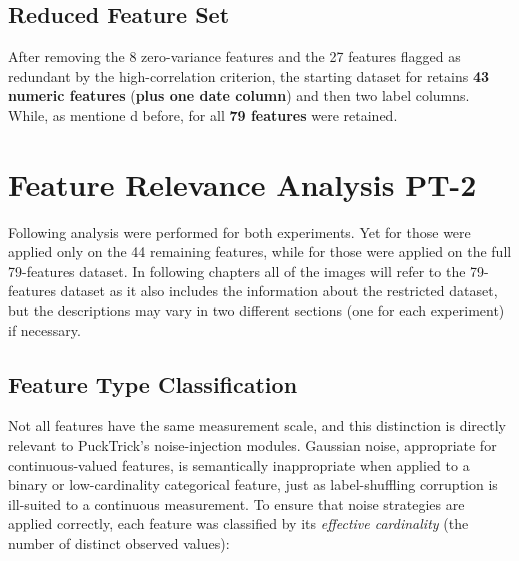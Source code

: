 \documentclass[../main.tex]{subfiles}
\begin{document}
\subsection{Reduced Feature Set}
\label{sec:reduced-feature-set}

After removing the 8 zero-variance features and the 27 features flagged as redundant by the high-correlation criterion, the starting dataset for  retains \textbf{43 numeric features} (\textbf{plus one date column}) and then two label columns. While, as mentione d before, for  all \textbf{79 features} were retained.


\newpage
\section{Feature Relevance Analysis PT-2}
\label{sec:feature-relevance-PT2}

Following analysis were performed for both experiments. Yet for  those were applied only on the 44 remaining features, while for  those were applied on the full 79-features dataset. In following chapters all of the images will refer to the 79-features dataset as it also includes the information about the restricted dataset, but the descriptions may vary in two different sections (one for each experiment) if necessary.


\subsection{Feature Type Classification}
\label{sec:feature-types}

Not all features have the same measurement scale, and this
distinction is directly relevant to PuckTrick's noise-injection modules.
Gaussian noise, appropriate for continuous-valued features, is semantically
inappropriate when applied to a binary or low-cardinality categorical feature,
just as label-shuffling corruption is ill-suited to a continuous measurement.
To ensure that noise strategies are applied correctly, each feature was
classified by its \emph{effective cardinality} (the number of distinct observed
values):
\end{document}

